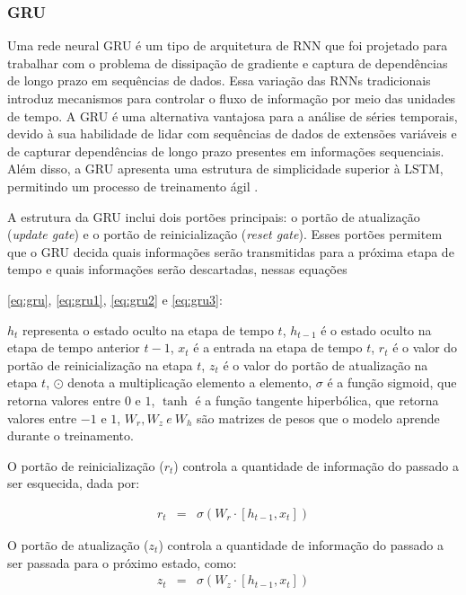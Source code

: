  \subsubsection{GRU}
 
Uma rede neural GRU é um tipo de arquitetura de RNN que foi projetado para trabalhar com o problema de dissipação de gradiente e captura de dependências de longo prazo em sequências de dados. Essa variação das RNNs tradicionais introduz mecanismos para controlar o fluxo de informação por meio das unidades de tempo.
A GRU é uma alternativa vantajosa para a análise de séries temporais, devido à sua habilidade de lidar com sequências de dados de extensões variáveis e de capturar dependências de longo prazo presentes em informações sequenciais. Além disso, a GRU apresenta uma estrutura de simplicidade superior à LSTM, permitindo um processo de treinamento ágil  \cite{mastersthesis53fd58a7}.
 
A estrutura da GRU inclui dois portões principais: o portão de atualização (\textit{update gate}) e o portão de reinicialização (\textit{reset gate}). Esses portões permitem que o GRU decida quais informações serão transmitidas para a próxima etapa de tempo e quais informações serão descartadas, nessas equações 
 
 \eqref{eq:gru}, \eqref{eq:gru1}, \eqref{eq:gru2} e \eqref{eq:gru3}:
 
\( h_t \) representa o estado oculto na etapa de tempo \( t \), \( h_{t-1} \) é o estado oculto na etapa de tempo anterior \( t-1 \), \( x_t \) é a entrada na etapa de tempo \( t \), \( r_t \) é o valor do portão de reinicialização na etapa \( t \), \( z_t \) é o valor do portão de atualização na etapa \( t \), \( \odot \) denota a multiplicação elemento a elemento, \( \sigma \) é a função sigmoid, que retorna valores entre $0$ e $1$, \( \tanh \) é a função tangente hiperbólica, que retorna valores entre $-1$ e $1$, \( W_r, W_z\ e\ W_h \) são matrizes de pesos que o modelo aprende durante o treinamento.
 
O portão de reinicialização (\(r_t\)) controla a quantidade de informação do passado a ser esquecida, dada por:
 	
 	\begin{eqnarray}
 		r_t &=& \sigma(W_r \cdot [h_{t-1}, x_t])\label{eq:gru}
 	\end{eqnarray} 
 	
O portão de atualização (\(z_t\)) controla a quantidade de informação do passado a ser passada para o próximo estado, como:
 	\begin{eqnarray}
 		z_t &=& \sigma(W_z \cdot [h_{t-1}, x_t])\label{eq:gru1}
 	\end{eqnarray}
 
